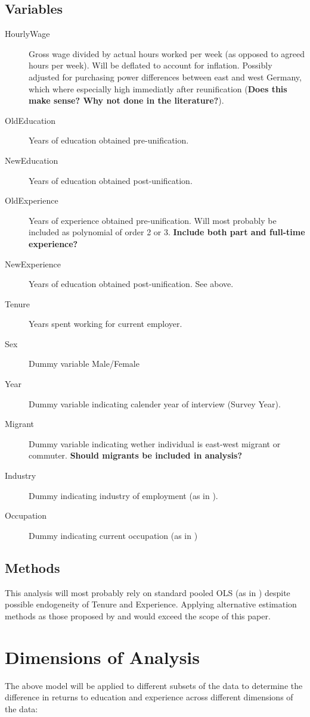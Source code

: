 \documentclass{article}
\begin{document}
\subsection{Variables}
\begin{description}
\item [HourlyWage] Gross wage divided by actual hours worked per week (as opposed to agreed hours per week). Will be deflated to account for inflation. Possibly adjusted for purchasing power differences between east and west Germany, which where especially high immediatly after reunification \cite{vortmann_zur_2013} (\textbf{Does this make sense? Why not done in the literature?}).  
\item[OldEducation] Years of education obtained pre-unification.
\item[NewEducation] Years of education obtained post-unification.
\item[OldExperience] Years of experience obtained pre-unification. Will most probably be included as polynomial of order 2 or 3. \textbf{Include both part and full-time experience?}
\item[NewExperience] Years of education obtained post-unification. See above.
\item[Tenure] Years spent working for current employer.
\item[Sex] Dummy variable Male/Female
\item[Year] Dummy variable indicating calender year of interview (Survey Year).
\item[Migrant] Dummy variable indicating wether individual is east-west migrant or commuter. \textbf{Should migrants be included in analysis?}
\item[Industry] Dummy indicating industry of employment (as in \cite{gathmann_understanding_2004}).
\item[Occupation] Dummy indicating current occupation (as in \cite{gathmann_understanding_2004})
\end{description}
\subsection{Methods} 
This analysis will most probably rely on standard pooled OLS (as in \cite{gathmann_understanding_2004}) despite possible endogeneity of Tenure and Experience. Applying alternative estimation methods as those proposed by \cite{altonji_wages_1987} and \cite{topel_specific_1990} would exceed the scope of this paper.

\section{Dimensions of Analysis}
The above model will be applied to different subsets of the data to determine the difference in returns to education and experience across different dimensions of the data:
\end{document}
